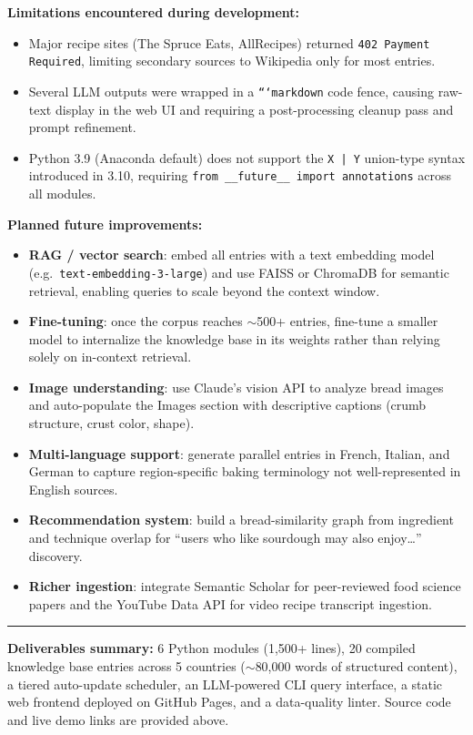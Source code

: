 \documentclass[10.5pt,a4paper]{article}
\begin{document}
\textbf{Limitations encountered during development:}
\begin{itemize}[leftmargin=*, itemsep=1pt]
  \item Major recipe sites (The Spruce Eats, AllRecipes) returned \texttt{402 Payment Required}, limiting secondary sources to Wikipedia only for most entries.
  \item Several LLM outputs were wrapped in a \texttt{```markdown} code fence, causing raw-text display in the web UI and requiring a post-processing cleanup pass and prompt refinement.
  \item Python 3.9 (Anaconda default) does not support the \texttt{X | Y} union-type syntax introduced in 3.10, requiring \texttt{from \_\_future\_\_ import annotations} across all modules.
\end{itemize}

\textbf{Planned future improvements:}
\begin{itemize}[leftmargin=*, itemsep=1pt]
  \item \textbf{RAG / vector search}: embed all entries with a text embedding model (e.g.\ \texttt{text-embedding-3-large}) and use FAISS or ChromaDB for semantic retrieval, enabling queries to scale beyond the context window.
  \item \textbf{Fine-tuning}: once the corpus reaches $\sim$500+ entries, fine-tune a smaller model to internalize the knowledge base in its weights rather than relying solely on in-context retrieval.
  \item \textbf{Image understanding}: use Claude's vision API to analyze bread images and auto-populate the Images section with descriptive captions (crumb structure, crust color, shape).
  \item \textbf{Multi-language support}: generate parallel entries in French, Italian, and German to capture region-specific baking terminology not well-represented in English sources.
  \item \textbf{Recommendation system}: build a bread-similarity graph from ingredient and technique overlap for ``users who like sourdough may also enjoy\ldots'' discovery.
  \item \textbf{Richer ingestion}: integrate Semantic Scholar for peer-reviewed food science papers and the YouTube Data API for video recipe transcript ingestion.
\end{itemize}

\vspace{5pt}
\hrule
\vspace{4pt}

{\small
\textbf{Deliverables summary:} 6 Python modules (1,500+ lines), 20 compiled knowledge base entries across 5 countries ($\sim$80,000 words of structured content), a tiered auto-update scheduler, an LLM-powered CLI query interface, a static web frontend deployed on GitHub Pages, and a data-quality linter. Source code and live demo links are provided above.
}
\end{document}
